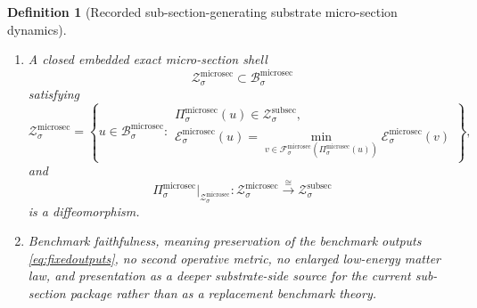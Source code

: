 \documentclass[11pt]{article}
\newcommand{\SubSectionBody}[1]{\mathcal B_{#1}^{\mathrm{subsec}}}
\newcommand{\SubSectionFunctional}[1]{\mathscr E_{#1}^{\mathrm{subsec}}}
\newcommand{\SubSectionShell}[1]{\mathcal Z_{#1}^{\mathrm{subsec}}}
\newcommand{\MicroSectionBody}[1]{\mathcal B_{#1}^{\mathrm{microsec}}}
\newcommand{\MicroSectionProj}[1]{\Pi_{#1}^{\mathrm{microsec}}}
\newcommand{\MicroSectionFiber}[2]{\mathcal F_{#1}^{\mathrm{microsec}}(#2)}
\newcommand{\MicroSectionSubMin}[1]{\mathfrak m_{#1}^{\mathrm{microsec}}}
\newcommand{\MicroSectionFunctional}[1]{\mathscr E_{#1}^{\mathrm{microsec}}}
\newcommand{\MicroSectionShell}[1]{\mathcal Z_{#1}^{\mathrm{microsec}}}
\newtheorem{definition}{Definition}
\begin{document}
\begin{definition}[Recorded sub-section-generating substrate micro-section dynamics]
\begin{enumerate}
\[    \mathrm{id}_{\SubSectionBody{\sigma}},
    \]
    and the effective minimum value recovers the recorded sub-section functional on the benchmark-relevant body:
    \[
    \SubSectionFunctional{\sigma}(y)
    =
    \MicroSectionFunctional{\sigma}\bigl(\MicroSectionSubMin{\sigma}(y)\bigr)
    =
    \min_{u\in\MicroSectionFiber{\sigma}{y}}
    \MicroSectionFunctional{\sigma}(u)
    \qquad
    \text{for every }
    y\in\SubSectionBody{\sigma}.
    \]
    \item A closed embedded exact micro-section shell
    \[
    \MicroSectionShell{\sigma}\subset\MicroSectionBody{\sigma}
    \]
    satisfying
    \[
    \MicroSectionShell{\sigma}
    =
    \left\{
    u\in\MicroSectionBody{\sigma}:
    \begin{array}{l}
    \MicroSectionProj{\sigma}(u)\in\SubSectionShell{\sigma},\\[0.2em]
    \MicroSectionFunctional{\sigma}(u)
    =
    \displaystyle\min_{v\in\MicroSectionFiber{\sigma}{\MicroSectionProj{\sigma}(u)}}
    \MicroSectionFunctional{\sigma}(v)
    \end{array}
    \right\},
    \]
    and
    \[
    \MicroSectionProj{\sigma}\big|_{\MicroSectionShell{\sigma}}
    :
    \MicroSectionShell{\sigma}
    \xrightarrow{\cong}
    \SubSectionShell{\sigma}
    \]
    is a diffeomorphism.
    \item Benchmark faithfulness, meaning preservation of the benchmark outputs \eqref{eq:fixedoutputs}, no second operative metric, no enlarged low-energy matter law, and presentation as a deeper substrate-side source for the current sub-section package rather than as a replacement benchmark theory.
\end{enumerate}
\end{definition}
\end{document}
